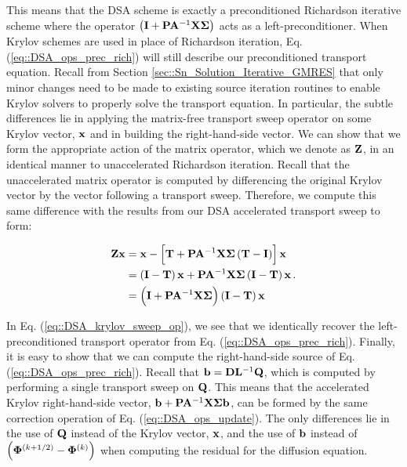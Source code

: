 \noindent This means that the DSA scheme is exactly a preconditioned Richardson iterative scheme where the operator $\left( {\bf I} + {\bf P} {\bf A}^{-1} {\bf X} {\bf \Sigma} \right)$ acts as a left-preconditioner. When Krylov schemes are used in place of Richardson iteration, Eq. (\ref{eq::DSA_ops_prec_rich}) will still describe our preconditioned transport equation. Recall from Section \ref{sec::Sn_Solution_Iterative_GMRES} that only minor changes need to be made to existing source iteration routines to enable Krylov solvers to properly solve the transport equation. In particular, the subtle differences lie in applying the matrix-free transport sweep operator on some Krylov vector, ${\bf x}$ and in building the right-hand-side vector. We can show that we form the appropriate action of the matrix operator, which we denote as ${\bf Z}$, in an identical manner to unaccelerated Richardson iteration. Recall that the unaccelerated matrix operator is computed by differencing the original Krylov vector by the vector following a transport sweep. Therefore, we compute this same difference with the results from our DSA accelerated transport sweep to form:

\begin{equation}
\label{eq::DSA_krylov_sweep_op}
\begin{aligned}
{\bf Z} {\bf x} &=  {\bf x} -  \left[ {\bf T}  + {\bf P} {\bf A}^{-1} {\bf X} {\bf \Sigma} \left(  {\bf T}    - {\bf I} \right) \right] {\bf x}\\
&=\left(  {\bf I} - {\bf T} \right){\bf x} + {\bf P} {\bf A}^{-1} {\bf X} {\bf \Sigma} \left(  {\bf I}    - {\bf T} \right) {\bf x} \\
&=\left(  {\bf I} +  {\bf P} {\bf A}^{-1} {\bf X} {\bf \Sigma} \right)  \left(  {\bf I}    - {\bf T} \right)  {\bf x}
\end{aligned} \, .
\end{equation}

\noindent In Eq. (\ref{eq::DSA_krylov_sweep_op}), we see that we identically recover the left-preconditioned transport operator from Eq. (\ref{eq::DSA_ops_prec_rich}). Finally, it is easy to show that we can compute the right-hand-side source of Eq. (\ref{eq::DSA_ops_prec_rich}). Recall that ${\bf b} = {\bf D}{\bf L}^{-1}{\bf Q}$, which is computed by performing a single transport sweep on ${\bf Q}$. This means that the accelerated Krylov right-hand-side vector, ${\bf b} +  {\bf P} {\bf A}^{-1}  {\bf X} {\bf \Sigma}    {\bf b}$, can be formed by the same correction operation of Eq. (\ref{eq::DSA_ops_update}). The only differences lie in the use of ${\bf Q}$ instead of the Krylov vector, ${\bf x}$, and the use of ${\bf b}$ instead of $\left( {\bf \Phi}^{(k+1/2)} - {\bf \Phi}^{(k)}  \right)$ when computing the residual for the diffusion equation.

